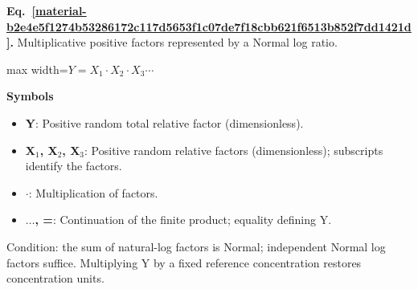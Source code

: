 \documentclass[11pt,a4paper]{article}
\begin{document}
\par\medskip
\begin{samepage}
\label{material-b2e4e5f1274b53286172c117d5653f1c07de7f18cbb621f6513b852f7dd1421d}
\noindent\textbf{Eq.~\ref*{material-b2e4e5f1274b53286172c117d5653f1c07de7f18cbb621f6513b852f7dd1421d}.} Multiplicative positive factors represented by a Normal log ratio.\par\nopagebreak
\begin{center}\begin{adjustbox}{max width=\linewidth}$\displaystyle Y=X_1\cdot X_2\cdot X_3\cdots$\end{adjustbox}\end{center}

\par\noindent\textbf{Symbols}

\begin{itemize}\setlength{\itemsep}{1pt}\setlength{\parsep}{0pt}
\item \textbf{Y}: Positive random total relative factor (dimensionless).
\item \textbf{X\ensuremath{{}_1}, X\ensuremath{{}_2}, X\ensuremath{{}_3}}: Positive random relative factors (dimensionless); subscripts identify the factors.
\item \textbf{\ensuremath{\cdot}}: Multiplication of factors.
\item \textbf{\ensuremath{\ldots}, =}: Continuation of the finite product; equality defining Y.
\end{itemize}

Condition: the sum of natural-log factors is Normal; independent Normal log factors suffice. Multiplying Y by a fixed reference concentration restores concentration units.

\end{samepage}
\medskip
\end{document}
